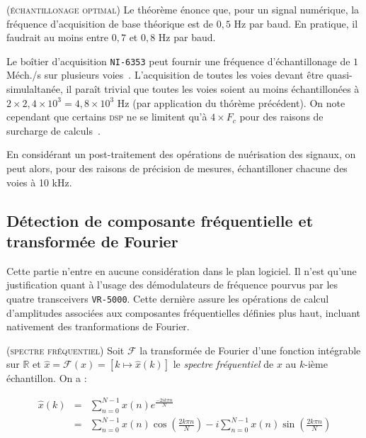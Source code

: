 \documentclass[twocolumn,pre,floats,aps,amsmath,amssymb]{revtex4}
\newenvironment{definition}[1][D\'efinition.]{\begin{trivlist}
\item[\hskip \labelsep {\bfseries #1}]}{\end{trivlist}}
\newenvironment{remark}[1][Remarque.]{\begin{trivlist}
\item[\hskip \labelsep {\bfseries #1}]}{\end{trivlist}}
\begin{document}
\begin{remark}
  \textsc{(\'echantillonage optimal)}
  Le th\'eor\`eme \'enonce que, pour un signal num\'erique, la fr\'equence d'acquisition de base th\'eorique est de $0,5$ Hz par baud. En pratique, il faudrait au moins entre $0,7$ et $0,8$ Hz par baud\cite{FV}.
\end{remark}

Le bo\^itier d'acquisition \texttt{NI-6353} peut fournir une fr\'equence d'\'echantillonage de $1$ M\'ech./s sur plusieurs voies~\cite{NI_6353_datasheet}. L'acquisition de toutes les voies devant \^etre quasi-simulaltan\'ee, il para\^it trivial que toutes les voies soient au moins \'echantillon\'ees \`a $2 \times 2,4 \times 10^3 = 4,8 \times 10^3$ Hz (par application du th\'or\`eme pr\'ec\'edent). On note cependant que certains \textsc{dsp} ne se limitent qu'\`a $4 \times F_c$ pour des raisons de surcharge de calculs~\cite{TI_MSP430}.

En consid\'erant un post-traitement des op\'erations de nu\'erisation des signaux, on peut alors, pour des raisons de pr\'ecision de mesures, \'echantilloner chacune des voies \`a 10 kHz.

\subsection{D\'etection de composante fr\'equentielle et transform\'ee de Fourier}

{ \color{rltred}{\Radioactivity} } Cette partie n'entre en aucune consid\'eration dans le plan logiciel. Il n'est qu'une justification quant \`a l'usage des d\'emodulateurs de fr\'equence pourvus par les quatre transceivers \texttt{VR-5000}. Cette derni\`ere assure les op\'erations de calcul d'amplitudes associ\'ees aux composantes fr\'equentielles d\'efinies plus haut, incluant nativement des tranformations de Fourier.

\begin{definition}
\textsc{(spectre fr\'equentiel)}
Soit $\mathcal{F}$ la transform\'ee de Fourier d'une fonction int\'egrable sur $\mathbb{R}$ et $\hat{x} = \mathcal{F}(x) = \left [ k \mapsto \hat{x}(k)\right ]$ le \textit{spectre fr\'equentiel} de $x$ au $k$-i\`eme \'echantillon. On a\cite{Senlis} :

\begin{eqnarray*}
\hat{x}(k) &=& \sum^{N - 1}_{n = 0}{x(n)e^{\frac{-2ik \pi n}{N}}}\\
           &=& \sum^{N - 1}_{n = 0}{x(n)\cos \left ( \frac{2k \pi n}{N} \right )} - i\sum^{N - 1}_{n = 0}{x(n)\sin \left ( \frac{2k \pi n}{N} \right )}
\end{eqnarray*}
\end{definition}
\end{document}
